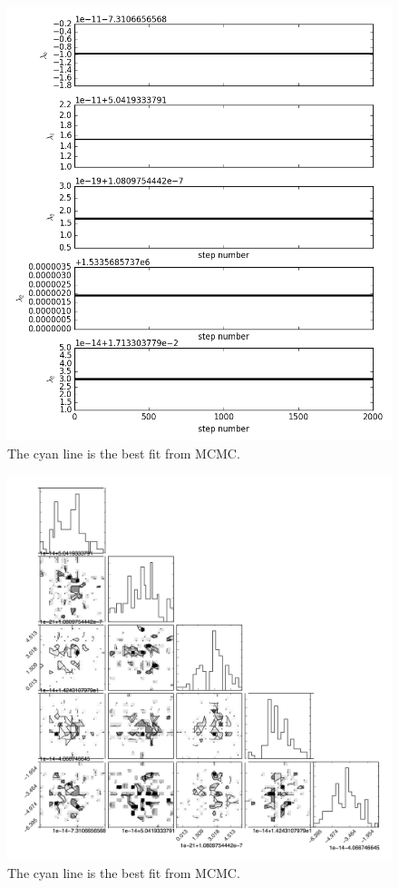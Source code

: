 \begin{figure}[ht]
  \includegraphics[width=\columnwidth]{img/line-time.png}
  \caption{The cyan line is the best fit from MCMC.}
  \label{fig:MCMC_time}
\end{figure}

\begin{figure}[ht]
  \includegraphics[width=\columnwidth]{img/line-triangle.jpg}
  \caption{The cyan line is the best fit from MCMC.}
  \label{fig:MCMC_triangle}
\end{figure}

